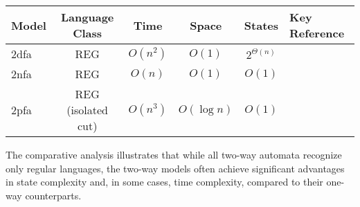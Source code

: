 \begin{tabular}{|l|c|c|c|c|l|}
    \hline
    \textbf{Model} & \textbf{Language Class} & \textbf{Time} & \textbf{Space} & \textbf{States} & \textbf{Key Reference} \\ 
    \hline
    \gls{2dfa}  & REG & \(O(n^2)\) & \(O(1)\) & \(2^{\Theta(n)}\) & \cite{shepherdson1959reduction} \\
    \gls{2nfa}  & REG & \(O(n)\) & \(O(1)\) & \(O(1)\) & \cite{sakoda1978nfas} \\
    \gls{2pfa}  & REG (isolated cut) & \(O(n^3)\) & \(O(\log n)\) & \(O(1)\) & \cite{dwork1990time} \\
    \hline
\end{tabular}

\begin{remark}
The comparative analysis illustrates that while all two-way automata recognize only regular languages, the two-way models often achieve significant advantages in state complexity and, in some cases, time complexity, compared to their one-way counterparts.
\end{remark} 
